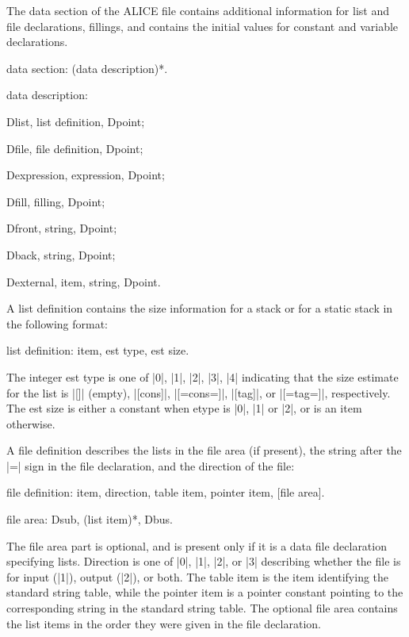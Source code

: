 \documentclass[titlepage]{article}
\newcommand\I{\textsf{ALICE}}
\newcommand\g[1]{\textsf{#1}}
\newenvironment{grammar}{%
\begin{list}{}{%
\setlength\leftmargin{18pt}%
\setlength\rightmargin{-5pt}%
\setlength\listparindent{20pt}%
\setlength\itemsep{1pt plus0.2ex}%
\setlength\parsep{0pt plus 2pt}%
\setlength\labelsep{-5pt}%
}\sf\mkoptions%
}{\end{list}}
\begin{document}
The \g{data section} of the \I{} file contains additional information for 
list and file declarations, fillings, and contains the initial values for 
\g{constant} and \g{variable} declarations. 
\begin{grammar}
\item data section: (data description)*.
\item data description:

            Dlist, list definition, Dpoint;

            Dfile, file definition, Dpoint;

            Dexpression, expression, Dpoint;

            Dfill, filling, Dpoint;

            Dfront, string, Dpoint;

            Dback, string, Dpoint;

            Dexternal, item, string, Dpoint.
\end{grammar}
A \g{list definition} contains the size information for a stack or for a
static stack in the following format:
\begin{grammar}
\item list definition: item, est type, est size.
\end{grammar}
The integer \g{est type} is one of \pp|0|, \pp|1|, \pp|2|, \pp|3|, \pp|4|
indicating that the size estimate for the list is \pp|[]| (empty),
\pp|[cons]|, \pp|[=cons=]|, \pp|[tag]|, or \pp|[=tag=]|, respectively. The
\g{est size} is either a constant when \g{etype} is \pp|0|, \pp|1| or
\pp|2|, or is an \g{item} otherwise.

A \g{file definition} describes the lists in the file area (if present),
the string after the \pp|=| sign in the file declaration, and the direction
of the file:
\begin{grammar}
\item file definition: item, direction, table item, pointer item, [file
area].

\item file area: Dsub, (list item)*, Dbus.
\end{grammar}
The \g{file area} part is optional, and is present only if it is a data file
declaration specifying lists. \g{Direction} is one of \pp|0|, \pp|1|,
\pp|2|, or \pp|3| describing whether the file is for input (\pp|1|), output
(\pp|2|), or both. The \g{table item} is the item identifying the standard
string table, while the \g{pointer item} is a pointer constant pointing to the
corresponding string in the standard string table. The optional \g{file
area} contains the list items in the order they were given in the file
declaration.
\end{document}
